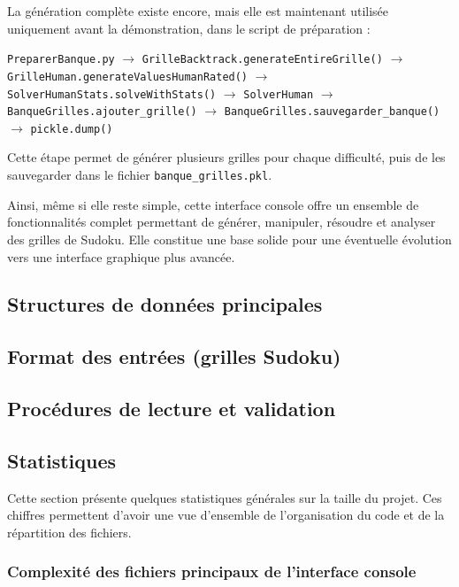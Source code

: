 \documentclass[a4paper]{article}
\begin{document}
La génération complète existe encore, mais elle est maintenant utilisée uniquement avant la démonstration, dans le script de préparation :

\begin{center}
\texttt{PreparerBanque.py}
$\rightarrow$ \texttt{GrilleBacktrack.generateEntireGrille()}
$\rightarrow$ \texttt{GrilleHuman.generateValuesHumanRated()}
$\rightarrow$ \texttt{SolverHumanStats.solveWithStats()}
$\rightarrow$ \texttt{SolverHuman}
$\rightarrow$ \texttt{BanqueGrilles.ajouter\_grille()}
$\rightarrow$ \texttt{BanqueGrilles.sauvegarder\_banque()}
$\rightarrow$ \texttt{pickle.dump()}
\end{center}

Cette étape permet de générer plusieurs grilles pour chaque difficulté, puis de les sauvegarder dans le fichier \texttt{banque\_grilles.pkl}.

Ainsi, même si elle reste simple, cette interface console offre un ensemble de fonctionnalités complet permettant de générer, manipuler, résoudre et analyser des grilles de Sudoku. Elle constitue une base solide pour une éventuelle évolution vers une interface graphique plus avancée.

\subsection{Structures de données principales}

\subsection{Format des entrées (grilles Sudoku)}

\subsection{Procédures de lecture et validation}

\subsection{Statistiques}

Cette section présente quelques statistiques générales sur la taille du projet. Ces chiffres permettent d'avoir une vue d'ensemble de l'organisation du code et de la répartition des fichiers.

\subsubsection{Complexité des fichiers principaux de l'interface console}
\end{document}
